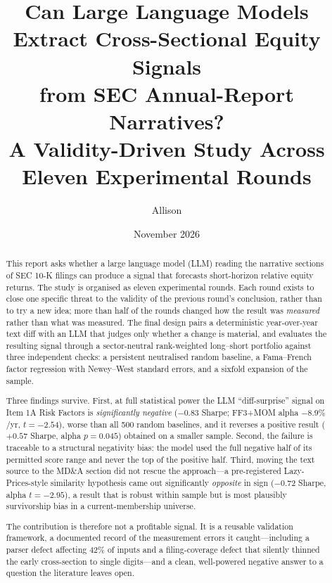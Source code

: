 \documentclass[11pt]{article}
\title{\textbf{Can Large Language Models Extract Cross-Sectional Equity Signals\\
from SEC Annual-Report Narratives?}\\[0.4em]
\large A Validity-Driven Study Across Eleven Experimental Rounds}
\author{Allison}
\date{November 2026}
\begin{document}
\maketitle

\begin{abstract}
\noindent
This report asks whether a large language model (LLM) reading the narrative sections of
SEC 10-K filings can produce a signal that forecasts short-horizon relative equity returns.
The study is organised as eleven experimental rounds. Each round exists to close one
specific threat to the validity of the previous round's conclusion, rather than to try a
new idea; more than half of the rounds changed how the result was \emph{measured} rather
than what was measured. The final design pairs a deterministic year-over-year text diff
with an LLM that judges only whether a change is material, and evaluates the resulting
signal through a sector-neutral rank-weighted long--short portfolio against three
independent checks: a persistent neutralised random baseline, a Fama--French factor
regression with Newey--West standard errors, and a sixfold expansion of the sample.

Three findings survive. First, at full statistical power the LLM ``diff-surprise'' signal
on Item 1A Risk Factors is \emph{significantly negative} ($-0.83$ Sharpe; FF3+MOM alpha
$-8.9\%$/yr, $t=-2.54$), worse than all 500 random baselines, and it reverses a positive
result ($+0.57$ Sharpe, alpha $p=0.045$) obtained on a smaller sample. Second, the
failure is traceable to a structural negativity bias: the model used the full negative
half of its permitted score range and never the top of the positive half. Third, moving
the text source to the MD\&A section did not rescue the approach---a pre-registered
Lazy-Prices-style similarity hypothesis came out significantly \emph{opposite} in sign
($-0.72$ Sharpe, alpha $t=-2.95$), a result that is robust within sample but is most
plausibly survivorship bias in a current-membership universe.

The contribution is therefore not a profitable signal. It is a reusable validation
framework, a documented record of the measurement errors it caught---including a parser
defect affecting 42\% of inputs and a filing-coverage defect that silently thinned the
early cross-section to single digits---and a clean, well-powered negative answer to a
question the literature leaves open.
\end{abstract}

\tableofcontents
\newpage
\end{document}
